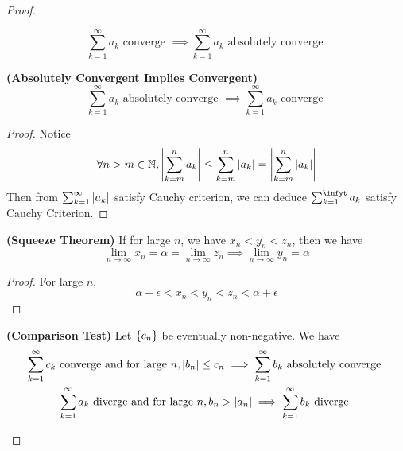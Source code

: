 \documentclass{report}
\begin{document}
\begin{proof}
\begin{theorem}
\begin{equation}
\sum_{k=1}^\infty a_k\text{ converge }\implies \sum_{k=1}^\infty a_k\text{ absolutely converge }
\end{equation}
\end{theorem}
\begin{theorem}
\label{2.2.5}
\textbf{(Absolutely Convergent Implies Convergent)} 
\begin{equation}
\sum_{k=1}^\infty a_k\text{ absolutely converge }\implies \sum_{k=1}^\infty a_k\text{ converge }
\end{equation}
\end{theorem}
\begin{proof}
Notice 
\begin{equation}
\forall n>m \in\mathbb{N}, \left|\sum_{k=m}^n a_k\right|\leq \sum_{k=m}^n \left|a_k\right|=\left|\sum_{k=m}^n \left|a_k\right|\right|
\end{equation}
Then from $\sum_{k=1}^\infty \left|a_k\right|$ satisfy Cauchy criterion, we can deduce $\sum_{k=1}^\infyt a_k$ satisfy Cauchy Criterion. 
\end{proof}
\begin{theorem}
\label{2.2.6}
\textbf{(Squeeze Theorem)} If for large $n$, we have  $x_n<y_n<z_n$, then we have
 \begin{equation}
\lim_{n\to\infty}x_n=\alpha =\lim_{n\to\infty}z_n\implies \lim_{n\to\infty}y_n=\alpha 
\end{equation}
\end{theorem}
\begin{proof}
For large $n$, 
 \begin{equation}
\alpha -\epsilon <x_n<y_n<z_n<\alpha +\epsilon 
\end{equation}
\end{proof}
\begin{theorem}
\label{2.2.7}
\textbf{(Comparison Test)} Let $\{ c_n \}$ be eventually non-negative. We have
\begin{gather}
  \sum_{k=1}^\infty c_k\text{ converge and for large }n, \left|b_n\right|\leq c_n\implies \sum_{k=1}^\infty b_k\text{ absolutely converge }\\
  \sum_{k=1}^\infty a_k\text{ diverge and for large $n$}, b_n>\left|a_n\right|\implies \sum_{k=1}^\infty b_k\text{ diverge }
\end{gather}

\end{theorem}
\end{proof}
\end{document}
